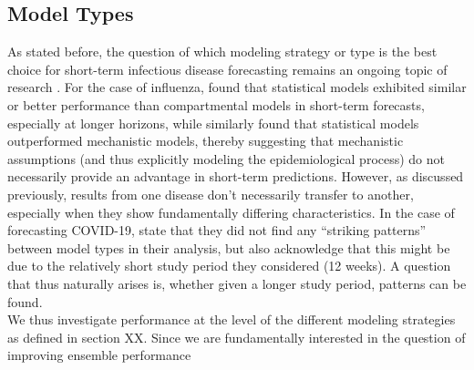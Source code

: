 \subsection{Model Types} \label{sub:model_types_analysis}
As stated before, the question of which modeling strategy or type is the best choice for short-term infectious disease forecasting remains an ongoing topic of research \citep{funk_short-term_nodate}. For the case of influenza, \cite{reich_collaborative_2019} found that statistical models exhibited similar or better performance than compartmental models in short-term forecasts, especially at longer horizons, %
while \cite{the_influenza_forecasting_working_group_collaborative_2019} similarly found that statistical models outperformed mechanistic models, thereby suggesting that mechanistic assumptions (and thus explicitly modeling the epidemiological process) do not necessarily provide an advantage in short-term predictions. %
However, as discussed previously, results from one disease don't necessarily transfer to another, especially when they show fundamentally differing characteristics.%
In the case of forecasting COVID-19, \citep{bracher_evaluating_2021} state that they did not find any ``striking patterns'' between model types in their analysis, but also acknowledge that this might be due to the relatively short study period they considered (12 weeks). A question that thus naturally arises is, whether given a longer study period, patterns can be found.\\
We thus investigate performance at the level of the different modeling strategies as defined in section XX. Since we are fundamentally interested in the question of improving ensemble performance
